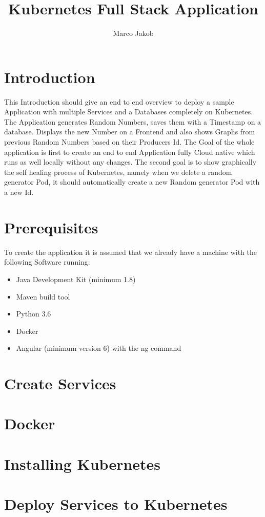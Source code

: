 \documentclass{article}
\author{Marco Jakob}
\title{Kubernetes Full Stack Application}
\begin{document}
\maketitle
\newpage
\tableofcontents
\newpage

\section{Introduction}
This Introduction should give an end to end overview to deploy a sample Application with multiple Services and a Databases completely on Kubernetes.
The Application generates Random Numbers, saves them with a Timestamp on a database. Displays the new Number on a Frontend and also shows Graphs from previous Random Numbers based on their Producers Id.
The Goal of the whole application is first to create an end to end Application fully Cloud native which runs as well locally without any changes. The second goal is to show graphically the self healing process of Kubernetes, namely when we delete a random generator Pod, it should automatically create a new Random generator Pod with a new Id.
\section{Prerequisites}
To create the application it is assumed that we already have a machine with the following Software running:
\begin{itemize}
\item Java Development Kit (minimum 1.8)
\item Maven build tool
\item Python 3.6
\item Docker
\item Angular (minimum version 6) with the ng command
\end{itemize}



\section{Create Services}

\section{Docker}

\section{Installing Kubernetes}

\section{Deploy Services to Kubernetes}
\end{document}
